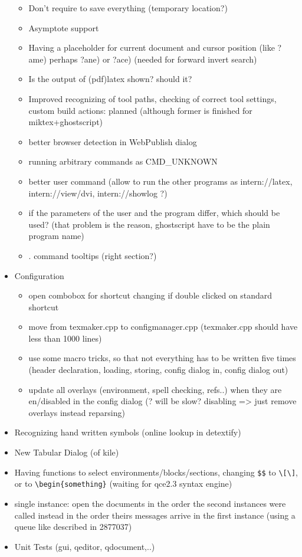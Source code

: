 \documentclass[10pt,a4paper,landscape]{report}
\begin{document}
\begin{itemize}
\begin{itemize}
		\item Don't require to save everything (temporary location?)
		\item Asymptote support
		\item Having a placeholder for current document and cursor position (like ?ame) perhaps ?ane) or ?ace) (needed for forward invert search)
		\item Is the output of (pdf)latex shown? should it?
		\item Improved recognizing of tool paths, checking of correct tool settings,  custom build actions: planned (although former is finished for miktex+ghostscript)
		\item better browser detection in WebPublish dialog 
		\item running arbitrary commands as CMD\_UNKNOWN
		\item better user command (allow to run the other programs as intern://latex, intern://view/dvi, intern://showlog ?)
		\item if the parameters of the user and the program differ, which should be used? (that problem is the reason, ghostscript have to be the plain program name)
		\item . command tooltips (right section?)
	\end{itemize}
	\item Configuration \begin{itemize}
		\item open combobox for shortcut changing if double clicked on standard shortcut
		\item move from texmaker.cpp to configmanager.cpp (texmaker.cpp should have less than 1000 lines)
		\item use some macro tricks, so that not everything has to be written five times (header declaration, loading, storing, config dialog in, config dialog out)
		\item update all overlays (environment, spell checking, refs..) when they are en/disabled in the config dialog (? will be slow? disabling => just remove overlays instead reparsing)
	\end{itemize} 
	\item Recognizing hand written symbols (online lookup in detextify)
	\item New Tabular Dialog (of kile)
	\item Having functions to select environments/blocks/sections, changing \verb+$$+ to \verb+\[\]+, or to \verb+\begin{something}+ (waiting for qce2.3 syntax engine)
	\item single instance: open the documents in the order the second instances were called instead in the order theirs messages arrive in the first instance (using a queue like described in 2877037)
	\item Unit Tests (gui, qeditor, qdocument,..)
\end{itemize}
\end{document}
